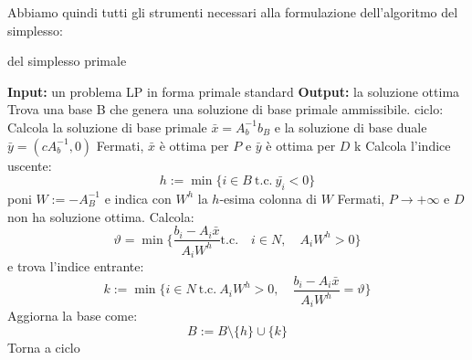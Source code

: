 \documentclass[a4paper,11pt]{article}
\begin{document}
Abbiamo quindi tutti gli strumenti necessari alla formulazione dell'algoritmo del simplesso:
\begin{algorithm}[H]
\caption{del simplesso primale}
\begin{algorithmic}
	\STATE \textbf{Input:} un problema LP in forma primale standard
	\STATE \textbf{Output:} la soluzione ottima 
	\STATE Trova una base B che genera una soluzione di base primale ammissibile.
	\STATE \textsf{ciclo:}
	\STATE Calcola la soluzione di base primale $\bar{x} = A_b^{-1} b_B$ e la soluzione di base duale $\bar{y} = (cA_b^{-1}, 0)$
		\STATE Fermati, $\bar{x}$ è ottima per $P$ e $\bar{y}$ è ottima per $D$
k\ELSE
		\STATE Calcola l'indice uscente: 
		$$
		h := \min\{ i \in B \ \text{t.c.} \ \bar{y_i} < 0 \}
		$$
		poni $W := -A_B^{-1}$ e indica con $W^h$ la $h$-esima colonna di $W$
	\ENDIF
		\STATE Fermati, $P \rightarrow +\infty$ e $D$ non ha soluzione ottima.
	\ELSE
		\STATE Calcola:
		$$
		\vartheta = \min\{ \frac{b_i - A_i \bar{x}}{A_i W^h} \text{t.c.} \quad i \in N, \quad A_i W^h > 0 \}
		$$
		e trova l'indice entrante: 
		$$ 
		k := \min\{ i \in N \ \text{t.c.} \ A_i W^h > 0, \quad \frac{b_i - A_i \bar{x}}{A_i W^h} = \vartheta \} 
		$$
	\ENDIF
	\STATE Aggiorna la base come:
	$$
	B := B \setminus \{h\} \cup \{k\}
	$$
	\STATE Torna a \textsf{ciclo}
\end{algorithmic}
\end{algorithm}
\end{document}
